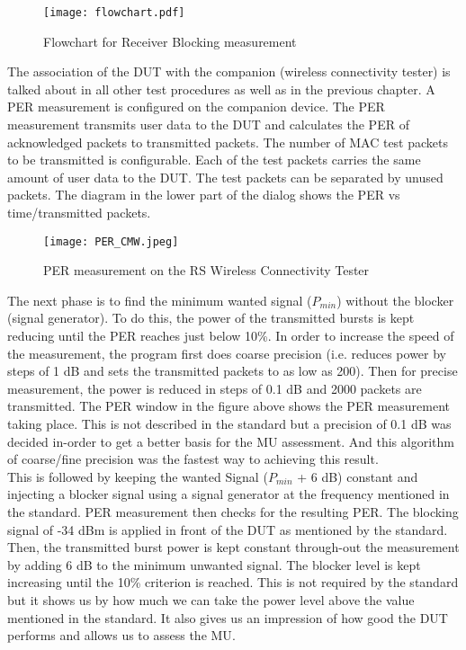  \begin{figure}[H]
\centering
\texttt{[image: flowchart.pdf]} \vspace{-1.8cm}
\caption{Flowchart for Receiver Blocking measurement}
\label{fig:flowchartrxvlock}
\end{figure}

The association of the \acs{DUT} with the companion (wireless connectivity tester) is talked about in all other test procedures as well as in the previous chapter. A \acf{PER} measurement is configured on the companion device. The \acs{PER} measurement transmits user data to the \acs{DUT} and calculates the \acs{PER} of acknowledged packets to transmitted packets. The number of \acs{MAC} test packets to be transmitted is configurable. Each of the test packets carries the same amount of user data to the \acs{DUT}. The test packets can be separated by unused packets. The diagram in the lower part of the dialog shows the \acs{PER} vs time/transmitted packets.

 \begin{figure}[H]
\centering
\texttt{[image: PER\_CMW.jpeg]} 
\caption{\ac{PER} measurement on the \acs{RS}\textregistered{} Wireless Connectivity Tester}
\label{fig:per}
\end{figure}

The next phase is to find the minimum wanted signal ($P_{min}$) without the blocker (signal generator). To do this, the power of the transmitted bursts is kept reducing until the \acs{PER} reaches just below 10\%. In order to increase the speed of the measurement, the program first does coarse precision (i.e. reduces power by steps of 1 dB and sets the transmitted packets to as low as 200). Then for precise measurement, the power is reduced in steps of 0.1 dB and 2000 packets are transmitted. The \acs{PER} window in the figure above shows the \acs{PER} measurement taking place. This is not described in the standard but a precision of 0.1 dB was decided in-order to get a better basis for the \acf{MU} assessment. And this algorithm of coarse/fine precision was the fastest way to achieving this result. \\
  
This is followed by keeping the wanted Signal ($P_{min}$ + 6 dB) constant and injecting a blocker signal using a signal generator at the frequency mentioned in the standard. \acs{PER} measurement then checks for the resulting \acs{PER}. The blocking signal of -34 dBm is applied in front of the \acs{DUT} as mentioned by the standard. Then, the transmitted burst power is kept constant through-out the measurement by adding 6 dB to the minimum unwanted signal. The blocker level is kept increasing until the 10\% criterion is reached. This is not required by the standard but it shows us by how much we can take the power level above the value mentioned in the standard. It also gives us an impression of how good the \acs{DUT} performs and allows us to assess the \acf{MU}.




